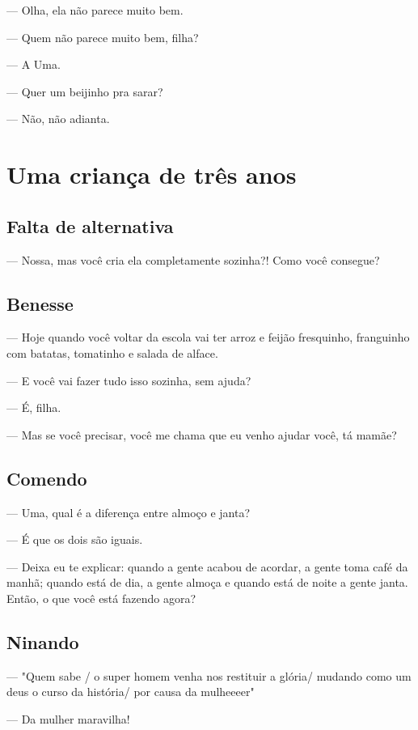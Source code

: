 {— Olha, ela não parece muito bem.

— Quem não parece muito bem, filha?

— A Uma.

— Quer um beijinho pra sarar?

— Não, não adianta.

  \part{Uma criança de três anos}

\chapter{Falta de alternativa}

— Nossa, mas você cria ela completamente sozinha?! Como você consegue?

\chapter{Benesse}

— Hoje quando você voltar da escola vai ter arroz e feijão fresquinho,
franguinho com batatas, tomatinho e salada de alface.

— E você vai fazer tudo isso sozinha, sem ajuda?

— É, filha.

— Mas se você precisar, você me chama que eu venho ajudar você, tá
mamãe?

\chapter{Comendo}

— Uma, qual é a diferença entre almoço e janta?

— É que os dois são iguais.

— Deixa eu te explicar: quando a gente acabou de acordar, a gente toma
café da manhã; quando está de dia, a gente almoça e quando está de noite
a gente janta. Então, o que você está fazendo agora?

\chapter{Ninando}

— "Quem sabe / o super homem venha nos restituir a glória/ mudando como
um deus o curso da história/ por causa da mulheeeer"

— Da mulher maravilha!

}

